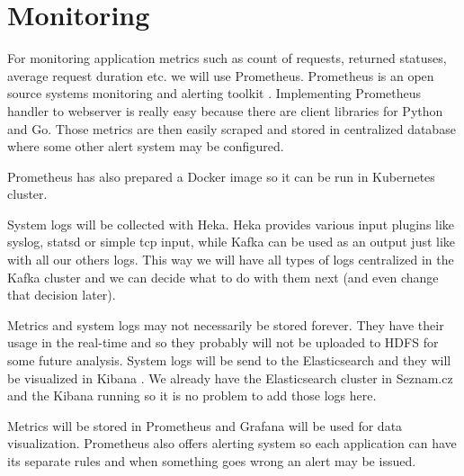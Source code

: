 \chapter{Monitoring}

For monitoring application metrics such as count of requests, returned statuses, average request duration etc. we will use Prometheus. Prometheus is an open source systems monitoring and alerting toolkit \cite{prometheus}. Implementing Prometheus handler to webserver is really easy because there are client libraries for Python and Go. Those metrics are then easily scraped and stored in centralized database where some other alert system may be configured.

Prometheus has also prepared a Docker image so it can be run in Kubernetes cluster.
 
System logs will be collected with Heka. Heka provides various input plugins like syslog, statsd or simple tcp input, while Kafka can be used as an output just like with all our others logs. This way we will have all types of logs centralized in the Kafka cluster and we can decide what to do with them next (and even change that decision later).
 
Metrics and system logs may not necessarily be stored forever. They have their usage in the real-time and so they probably will not be uploaded to HDFS for some future analysis. System logs will be send to the Elasticsearch and they will be visualized in Kibana \cite{kibana}. We already have the Elasticsearch cluster in Seznam.cz and the Kibana running so it is no problem to add those logs here.

Metrics will be stored in Prometheus and Grafana \cite{grafana} will be used for data visualization. Prometheus also offers alerting system so each application can have its separate rules and when something goes wrong an alert may be issued.
